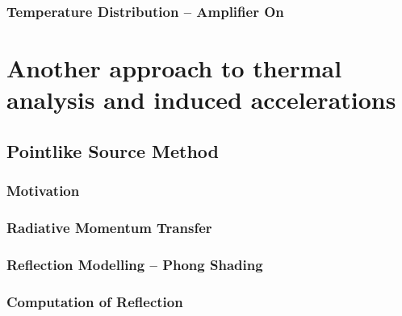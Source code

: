  {\small\textit{\lipsum[1-2]}}

\subsubsection{Temperature Distribution -- Amplifier On}
\label{sec:TempDist_AmpOn}

 {\small\textit{\lipsum[1-2]}}


\section{Another approach to thermal analysis and induced accelerations}
\label{sec:Thermal_Accelerations}

 {\small\textit{\lipsum[1-2]}}

\subsection{Pointlike Source Method}
\label{sec:Source_method}

 {\small\textit{\lipsum[1-2]}}

\subsubsection{Motivation}
\label{subsec:Source_method_motivation}

 {\small\textit{\lipsum[1-2]}}

\subsubsection{Radiative Momentum Transfer}
\label{subsec:RadMomTransf}

 {\small\textit{\lipsum[1-2]}}

\subsubsection{Reflection Modelling -- Phong Shading}
\label{subsec:Phong}

 {\small\textit{\lipsum[1-2]}}

\subsubsection{Computation of Reflection}
\label{subsec:reflection_computation}

